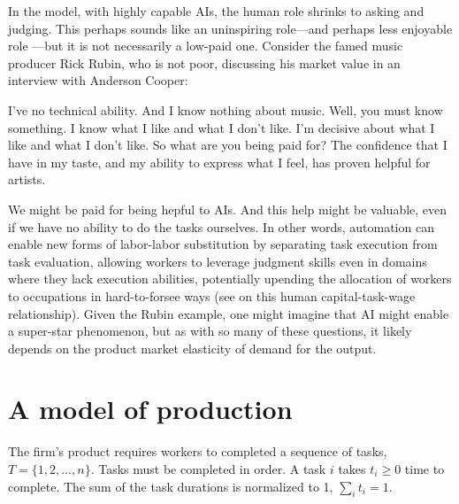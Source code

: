\documentclass{article}
\begin{document}
In the model, with highly capable AIs, the human role shrinks to asking and judging. 
This perhaps sounds like an uninspiring role---and perhaps less enjoyable role \citep{toner2024artificial}---but it is not necessarily a low-paid one. 
Consider the famed music producer Rick Rubin, who is not poor, discussing his market value in an interview with Anderson Cooper:
\begin{dialogue}
     I've no technical ability. And I know nothing about music.
     Well, you must know something.
     I know what I like and what I don't like. I'm decisive about what I like and what I don't like.
     So what are you being paid for?
     The confidence that I have in my taste, and my ability to express what I feel, has proven helpful for artists.
\end{dialogue}
We might be paid for being hepful to AIs.
And this help might be valuable, even if we have no ability to do the tasks ourselves.
In other words, automation can enable new forms of labor-labor substitution by separating task execution from task evaluation, allowing workers to leverage judgment skills even in domains where they lack execution abilities, potentially upending the allocation of workers to occupations in hard-to-forsee ways (see \cite{autor2013putting} on this human capital-task-wage relationship).
Given the Rubin example, one might imagine that AI might enable a super-star phenomenon, but as with so many of these questions, it likely depends on the product market elasticity of demand for the output.


\section{A model of production}

The firm's product requires workers to completed a sequence of tasks, $T = \{1, 2, \dots, n\}$.
Tasks must be completed in order. 
A task $i$ takes $t_i \ge 0$ time to complete.
The sum of the task durations is normalized to 1, $\sum_i t_i = 1$.
\end{document}
